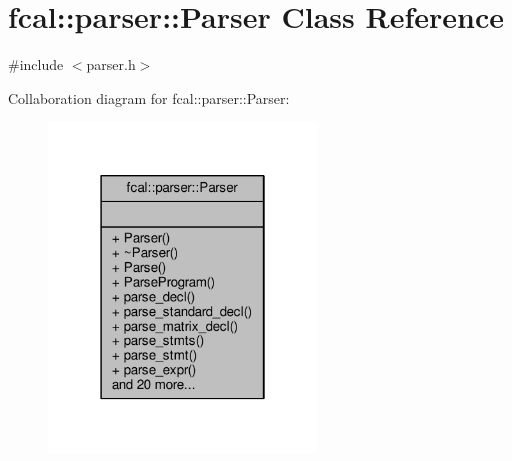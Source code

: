 \hypertarget{classfcal_1_1parser_1_1Parser}{}\section{fcal\+:\+:parser\+:\+:Parser Class Reference}
\label{classfcal_1_1parser_1_1Parser}


{\ttfamily \#include $<$parser.\+h$>$}



Collaboration diagram for fcal\+:\+:parser\+:\+:Parser\+:
\nopagebreak
\begin{figure}[H]
\begin{center}
\leavevmode
\includegraphics[width=202pt]{classfcal_1_1parser_1_1Parser__coll__graph}
\end{center}
\end{figure}
